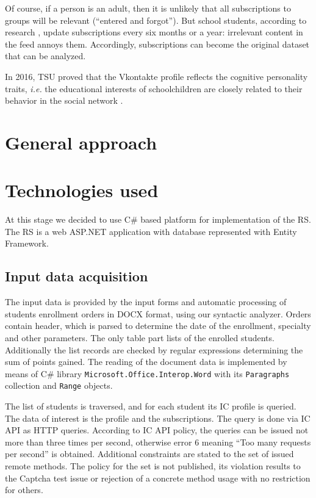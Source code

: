 \documentclass[conference]{IEEEtran}
\begin{document}
Of course, if a person is an adult, then it is unlikely that all subscriptions to groups will be relevant (``entered and forgot'').  But school students, according to research \cite{11}, update subscriptions every six months or a year: irrelevant content in the feed annoys them.  Accordingly, subscriptions can become the original dataset that can be analyzed.

In 2016, TSU proved that the Vkontakte profile reflects the cognitive personality traits, \emph{i.e.} the educational interests of schoolchildren are closely related to their behavior in the social network \cite{c9}.


\section{General approach}


\section{Technologies used}
\label{sec:tech}

At this stage we decided to use C\# based platform for implementation of the RS.  The RS is a web ASP.NET application with database represented with Entity Framework.

\subsection{Input data acquisition}
\label{sec:tech-input}

The input data is provided by the input forms and automatic processing of students enrollment orders in DOCX format, using our syntactic analyzer.  Orders contain header, which is parsed to determine the date of the enrollment, specialty and other parameters.  The only table part lists of the enrolled students.  Additionally the list records are checked by regular expressions determining the sum of points gained.  The reading of the document data is implemented by means of C\# library \texttt{Microsoft.Office.Interop.Word} with its \texttt{Paragraphs} collection and \texttt{Range} objects.

The list of students is traversed, and for each student its IC profile is queried.  The data of interest is the profile and the subscriptions.  The query is done via IC API as HTTP queries.  According to IC API policy, the queries can be issued not more than three times per second, otherwise error 6 meaning ``Too many requests per second'' is obtained.  Additional constraints are stated to the set of issued remote methods.  The policy for the set is not published, its violation results to the Captcha test issue or rejection of a concrete method usage with no restriction for others.
\end{document}
